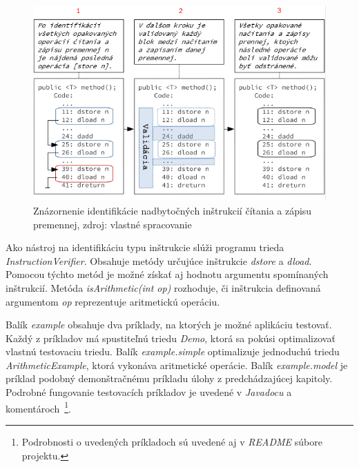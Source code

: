 \documentclass[11pt,final,oneside]{fithesis}
\begin{document}
\begin{figure}[h]
  \centering
   \includegraphics[width=\textwidth]{identification.png}
  \caption{Znázornenie identifikácie nadbytočných inštrukcií čítania a zápisu 
  premennej, zdroj: vlastné spracovanie}
  \label{fig:identify}
\end{figure}

Ako nástroj na identifikáciu typu inštrukcie slúži programu trieda 
\textit{InstructionVerifier}. Obsahuje metódy určujúce inštrukcie 
\textit{dstore} a \textit{dload}. Pomocou týchto metód je možné získať aj 
hodnotu argumentu spomínaných inštrukcií. Metóda \textit{isArithmetic(int op)} 
rozhoduje, či inštrukcia definovaná argumentom \textit{op} reprezentuje 
aritmetickú operáciu.

Balík \textit{example} obsahuje dva príklady, na ktorých je možné aplikáciu 
testovať. Každý z príkladov má spustiteľnú triedu \textit{Demo}, ktorá sa 
pokúsi optimalizovať vlastnú testovaciu triedu. Balík \textit{example.simple} 
optimalizuje jednoduchú triedu \textit{ArithmeticExample}, ktorá vykonáva 
aritmetické operácie. Balík \textit{example.model} je príklad podobný 
demonštračnému príkladu úlohy z predchádzajúcej kapitoly. Podrobné fungovanie 
testovacích príkladov je uvedené v \textit{Javadocu} a
komentároch~\footnote{Podrobnosti o uvedených príkladoch sú uvedené aj
v \textit{README} súbore projektu.}.
\end{document}
